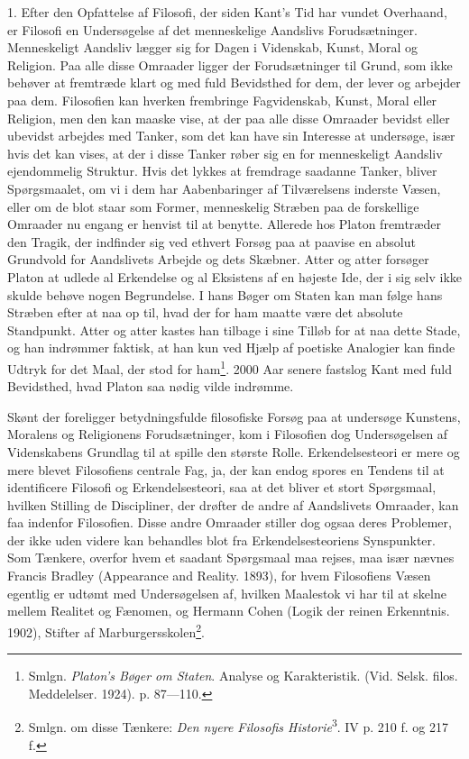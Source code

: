 \documentclass[12pt]{article}
\newcommand{\opage}[1]{\marginnote{\footnotesize\textit{[#1]}}}
\begin{document}
\opage{3}1. Efter den Opfattelse af Filosofi, der siden Kant's Tid
har vundet Overhaand, er Filosofi en Undersøgelse af det
menneskelige Aandslivs Forudsætninger. Menneskeligt Aandsliv
lægger sig for Dagen i Videnskab, Kunst, Moral og Religion. Paa
alle disse Omraader ligger der Forudsætninger til Grund, som ikke
behøver at fremtræde klart og med fuld Bevidsthed for dem, der
lever og arbejder paa dem. Filosofien kan hverken frembringe
Fagvidenskab, Kunst, Moral eller Religion, men den kan maaske vise,
at der paa alle disse Omraader bevidst eller ubevidst arbejdes med
Tanker, som det kan have sin Interesse at undersøge, især hvis det
kan vises, at der i disse Tanker røber sig en for menneskeligt
Aandsliv ejendommelig Struktur. Hvis det lykkes at fremdrage
saadanne Tanker, bliver Spørgsmaalet, om vi i dem har Aabenbaringer
af Tilværelsens inderste Væsen, eller om de blot staar som Former,
menneskelig Stræben paa de forskellige Omraader nu engang er henvist
til at benytte. Allerede hos Platon fremtræder den Tragik, der
indfinder sig ved ethvert Forsøg paa at paavise en absolut Grundvold
for Aandslivets Arbejde og dets Skæbner. Atter og atter forsøger
Platon at udlede al Erkendelse og al Eksistens af en højeste Ide,
der i sig selv ikke skulde behøve nogen Begrundelse. I hans Bøger
\guillemotright{}om Staten\guillemotleft{} kan man følge hans Stræben efter at naa op til, hvad der
for ham maatte være det absolute Standpunkt. Atter og atter kastes
\setcounter{footnote}{0}%
\opage{4}han tilbage i sine Tilløb for at naa dette Stade, og han
indrømmer faktisk, at han kun ved Hjælp af poetiske Analogier kan
finde Udtryk for det Maal, der stod for ham\footnote{Smlgn.
\textit{Platon's Bøger om Staten}. Analyse og Karakteristik. (Vid.
Selsk. filos. Meddelelser. 1924). p. 87---110.}. 2000 Aar senere
fastslog Kant med fuld Bevidsthed, hvad Platon saa nødig vilde
indrømme.

Skønt der foreligger betydningsfulde filosofiske Forsøg paa at
undersøge Kunstens, Moralens og Religionens Forudsætninger, kom i
Filosofien dog Undersøgelsen af Videnskabens Grundlag til at spille
den største Rolle. Erkendelsesteori er mere og mere blevet
Filosofiens centrale Fag, ja, der kan endog spores en Tendens til at
identificere Filosofi og Erkendelsesteori, saa at det bliver et stort
Spørgsmaal, hvilken Stilling de Discipliner, der drøfter de andre af
Aandslivets Omraader, kan faa indenfor Filosofien. Disse andre
Omraader stiller dog ogsaa deres Problemer, der ikke uden videre kan
behandles blot fra Erkendelsesteoriens Synspunkter. Som Tænkere,
overfor hvem et saadant Spørgsmaal maa rejses, maa især nævnes
Francis Bradley (Appearance and Reality. 1893), for hvem Filosofiens
Væsen egentlig er udtømt med Undersøgelsen af, hvilken Maalestok vi
har til at skelne mellem Realitet og Fænomen, og Hermann Cohen
(Logik der reinen Erkenntnis. 1902), Stifter af
Marburgersskolen\footnote{Smlgn. om disse Tænkere: \textit{Den nyere
Filosofis Historie}\textsuperscript{3}. IV p. 210 f. og 217 f.}.
\end{document}
